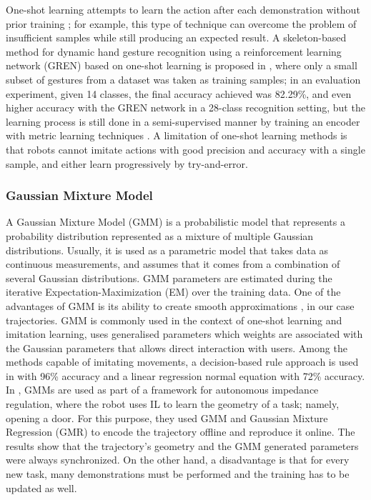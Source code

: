 \documentclass[thesis]{mas_proposal}
\begin{document}
		One-shot learning attempts to learn the action after each demonstration without prior training \cite{Yan2010}; for example, this type of technique can overcome the problem of insufficient samples while still producing an expected result. A skeleton-based method for dynamic hand gesture recognition using a reinforcement learning network (GREN) based on one-shot learning is proposed in \cite{Chunyong2020}, where only a small subset of gestures from a dataset was taken as training samples; in an evaluation experiment, given 14 classes, the final accuracy achieved was 82.29\%, and even higher accuracy with the GREN network in a 28-class recognition setting, but the learning process is still done in a semi-supervised manner by training an encoder with metric learning techniques \cite{Sabater2021}. A limitation of one-shot learning methods is that robots cannot imitate actions with good precision and accuracy with a single sample, and either learn progressively by try-and-error.
		
	\subsubsection{Gaussian Mixture Model}
	
		A Gaussian Mixture Model (GMM) is a probabilistic model that represents a probability distribution represented as a mixture of multiple Gaussian distributions. Usually, it is used as a parametric model that takes data as continuous measurements, and assumes that it comes from a combination of several Gaussian distributions. GMM parameters are estimated during the iterative Expectation-Maximization (EM) over the training data. One of the advantages of GMM is its ability to create smooth approximations \cite{Reynolds2009}, in our case trajectories. GMM is commonly used in the context of one-shot learning and imitation learning, uses generalised parameters which weights are associated with the Gaussian parameters that allows direct interaction with users. Among the methods capable of imitating movements, a decision-based rule approach is used in \cite{Itauma2012} with 96\% accuracy and a linear regression normal equation with 72\% accuracy. In \cite{Wu2020}, GMMs are used as part of a framework for autonomous impedance regulation, where the robot uses IL to learn the geometry of a task; namely, opening a door. For this purpose, they used GMM and Gaussian Mixture Regression (GMR) to encode the trajectory offline and reproduce it online. The results show that the trajectory's geometry and the GMM generated parameters were always synchronized. On the other hand, a disadvantage is that for every new task, many demonstrations must be performed and the training has to be updated as well.
		
\end{document}
